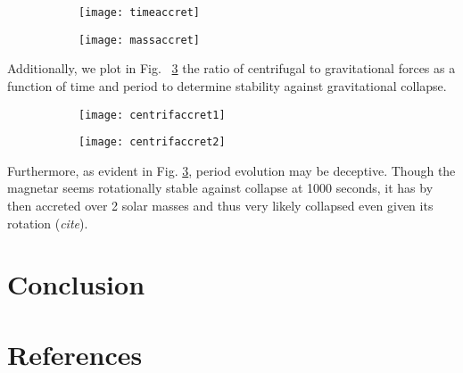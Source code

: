 \documentclass{article}
\begin{document}
\begin{figure}[h!]
\centering
\begin{subfigure}{.5\textwidth}
    \centering
    \texttt{[image: timeaccret]}
    \caption{}
    \label{}
\end{subfigure}%
\begin{subfigure}{.5\textwidth}
    \centering
    \texttt{[image: massaccret]}
    \caption{}
    \label{}
\end{subfigure}
\caption{}
\label{fig:6}
\end{figure}

Additionally, we plot in Fig. ~\ref{fig:6} the ratio of centrifugal to gravitational forces as a function of time and period to determine stability against gravitational collapse.

\begin{figure}[h!]
\centering
\begin{subfigure}{.5\textwidth}
    \centering
    \texttt{[image: centrifaccret1]}
    \caption{}
    \label{}
\end{subfigure}%
\begin{subfigure}{.5\textwidth}
    \centering
    \texttt{[image: centrifaccret2]}
    \caption{}
    \label{}
\end{subfigure}
\caption{}
\label{fig:7}
\end{figure}

Furthermore, as evident in Fig. \ref{fig:6}, period evolution may be deceptive. Though the magnetar seems rotationally stable against collapse at 1000 seconds, it has by then accreted over 2 solar masses and thus very likely collapsed even given its rotation (\textit{cite}).

\section{Conclusion}

\newpage

\renewcommand*{\refname}{}
\section{References}


\end{document}
